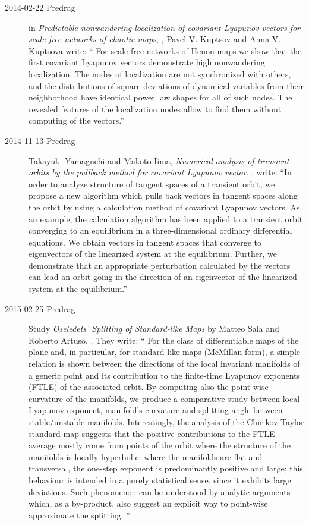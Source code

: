 \begin{description}
\item[2014-02-22 Predrag] in
\emph{Predictable nonwandering localization of covariant Lyapunov vectors for
  scale-free networks of chaotic maps},
, Pavel V. Kuptsov and Anna V. Kuptsova write: ``
For scale-free networks of Henon maps we show that the first covariant
Lyapunov vectors demonstrate high nonwandering localization. The nodes of
localization are not synchronized with others, and the distributions of square
deviations of dynamical variables from their neighborhood have identical power
law shapes for all of such nodes. The revealed features of the localization
nodes allow to find them without computing of the vectors.''

\item[2014-11-13 Predrag]
Takayuki Yamaguchi and Makoto Iima,
{\em Numerical analysis of transient orbits by the pullback method for
covariant Lyapunov vector}, , write:
``In order to analyze structure of tangent spaces of a transient orbit,
we propose a new algorithm which pulls back vectors in tangent spaces
along the orbit by using a calculation method of covariant Lyapunov
vectors. As an example, the calculation algorithm has been applied to a
transient orbit converging to an equilibrium in a three-dimensional
ordinary differential equations. We obtain vectors in tangent spaces that
converge to eigenvectors of the linearized system at the equilibrium.
Further, we demonstrate that an appropriate perturbation calculated by
the vectors can lead an orbit going in the direction of an eigenvector of
the linearized system at the equilibrium.''

\item[2015-02-25 Predrag] Study
\emph{Oseledets' Splitting of Standard-like Maps} by
Matteo Sala and Roberto Artuso, . They write:
``
    For the class of differentiable maps of the plane and, in
    particular, for standard-like maps (McMillan form), a simple
    relation is shown between the directions of the local invariant
    manifolds of a generic point and its contribution to the
    finite-time Lyapunov exponents (FTLE) of the associated orbit. By
    computing also the point-wise curvature of the manifolds, we
    produce a comparative study between local Lyapunov exponent,
    manifold's curvature and splitting angle between stable/unstable
    manifolds. Interestingly, the analysis of the Chirikov-Taylor
    standard map suggests that the positive contributions to the FTLE
    average mostly come from points of the orbit where the structure of
    the manifolds is locally hyperbolic: where the manifolds are flat
    and transversal, the one-step exponent is predominantly positive
    and large; this behaviour is intended in a purely statistical
    sense, since it exhibits large deviations. Such phenomenon can be
    understood by analytic arguments which, as a by-product, also
    suggest an explicit way to point-wise approximate the splitting.
''


\end{description}
